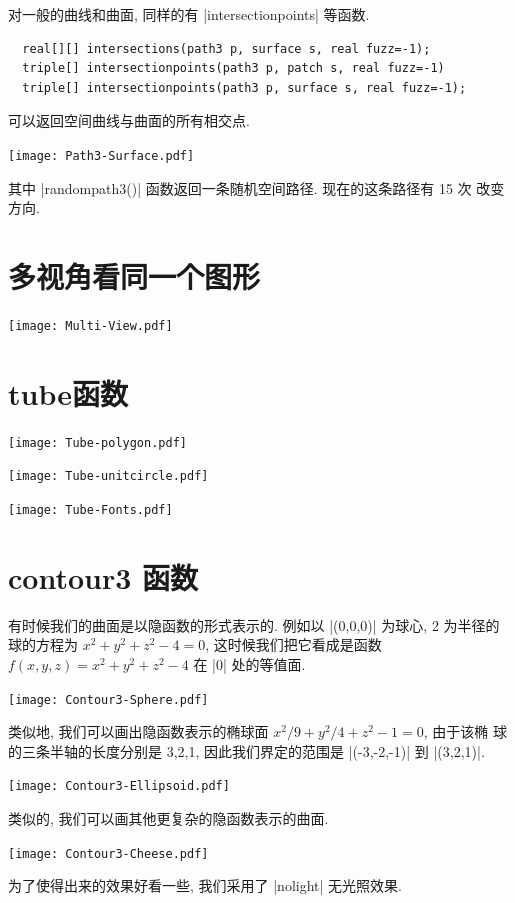 \documentclass[nofonts,CJKnormalspaces]{ctexbook}[2009/05/20]
\begin{document}
对一般的曲线和曲面, 同样的有 |intersectionpoints| 等函数.
\begin{lstlisting}
  real[][] intersections(path3 p, surface s, real fuzz=-1);
  triple[] intersectionpoints(path3 p, patch s, real fuzz=-1)
  triple[] intersectionpoints(path3 p, surface s, real fuzz=-1);
\end{lstlisting}
可以返回空间曲线与曲面的所有相交点.
\begin{center}\texttt{[image: Path3-Surface.pdf]}\end{center}%

其中 |randompath3()| 函数返回一条随机空间路径. 现在的这条路径有 15 次
改变方向.

\section{多视角看同一个图形}
\begin{center}\texttt{[image: Multi-View.pdf]}\end{center}%


\section{tube函数}
\begin{center}\texttt{[image: Tube-polygon.pdf]}\end{center}%


\begin{center}\texttt{[image: Tube-unitcircle.pdf]}\end{center}%


\begin{center}\texttt{[image: Tube-Fonts.pdf]}\end{center}%


\section{contour3 函数}
有时候我们的曲面是以隐函数的形式表示的. 例如以 |(0,0,0)| 为球心, 2 为半径的球的方程为
$x^2+y^2+z^2-4=0$, 这时候我们把它看成是函数
$f(x,y,z)=x^{2}+y^{2}+z^{2}-4$ 在 |0| 处的等值面.
\begin{center}\texttt{[image: Contour3-Sphere.pdf]}\end{center}%

类似地, 我们可以画出隐函数表示的椭球面 $x^2/9+y^2/4+z^2-1=0$, 由于该椭
球的三条半轴的长度分别是 3,2,1, 因此我们界定的范围是 |(-3,-2,-1)| 到
|(3,2,1)|.
\begin{center}\texttt{[image: Contour3-Ellipsoid.pdf]}\end{center}%

类似的, 我们可以画其他更复杂的隐函数表示的曲面.
\begin{center}\texttt{[image: Contour3-Cheese.pdf]}\end{center}%

为了使得出来的效果好看一些, 我们采用了 |nolight| 无光照效果.
\end{document}
